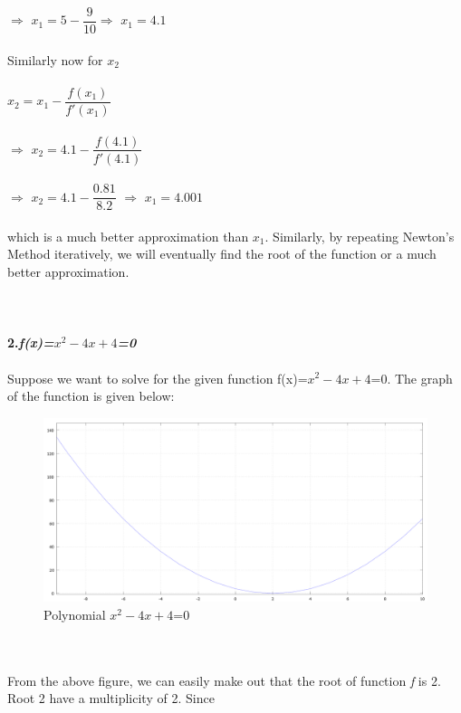 \documentclass[15pt]{report}
\begin{document}
$\Rightarrow$ {\large $x_{1}=5-\dfrac{9}{10}$}\hspace*{20mm}$\Rightarrow$ {\large $x_{1}=4.1$}\\ \\
Similarly now for $x_{2}$ \\ \\
{\large $x_{2}=x_{1}-\dfrac{f(x_{1})}{f'(x_{1})}$}\\ \\
$\Rightarrow$ {\large $x_{2}=4.1-\dfrac{f(4.1)}{f'(4.1)}$} \\ \\
$\Rightarrow$ {\large $x_{2}=4.1-\dfrac{0.81}{8.2}$} \hspace*{20mm} $\Rightarrow$ {\large $x_{1}=4.001$}\\ \\
which is a much better approximation than $x_{1}$. Similarly, by repeating Newton's Method iteratively, we will eventually find the root of the function or a much better approximation.\\ \\ \\ \\
{\large \textbf{2.\hspace*{5mm}\textit{f(x)=$x^{2}-4x+4$=0}}}\\ \\
Suppose we want to solve for the given function f(x)=$x^{2}-4x+4$=0. The graph of the function is given below:\\
\begin{figure}[h]
\centering
\includegraphics[width = 1.2 \columnwidth]{4}
\caption{Polynomial $x^{2}-4x+4$=0}
\label{fig:Eg. 2}
\end{figure}\\ \\
From the above figure, we can easily make out that the root of function \textit{f} is 2. Root 2 have a multiplicity of 2. Since\\
\end{document}
